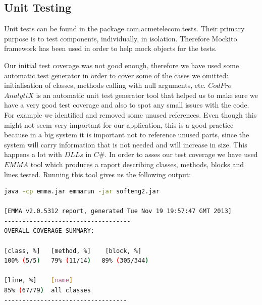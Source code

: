 \documentclass[11pt,twocolumn]{article} %
\begin{document}
\subsection{Unit Testing}
Unit tests can be found in the package com.acmetelecom.tests. Their primary purpose is to test components, individually, in isolation. 
Therefore Mockito\cite{mockito} framework has been used in order to help mock objects for the tests.

Our initial test coverage was not good enough, therefore we have used some automatic test generator in order to cover some of the cases we omitted: initialisation of classes, methods calling with null arguments, etc. 
$CodPro$ $AnalytiX$\cite{codePro} is an automatic unit test generator tool that helped us to make sure we have a very good test coverage and also to spot any small issues with the code. 
For example we identified and removed some unused references. Even though this might not seem very important for our application, this is a good practice because in a 
big system it is important not to reference unused parts, since the system will carry information that is not needed and will increase in size. This happens a lot with $DLLs$ in $C\#$. 
In order to asses our test coverage we have used $EMMA$ tool which produces a raport describing classes, methods, blocks and lines tested. Running this tool gives us the following output:

\begin{lstlisting}[language=bash]
java -cp emma.jar emmarun -jar softeng2.jar

[EMMA v2.0.5312 report, generated Tue Nov 19 19:57:47 GMT 2013]
-----------------------------------
OVERALL COVERAGE SUMMARY:

[class, %]   [method, %]    [block, %]   
100% (5/5)   79% (11/14)   89% (305/344) 

[line, %]    [name]
85% (67/79)  all classes
----------------------------------
\end{lstlisting}
\end{document}
